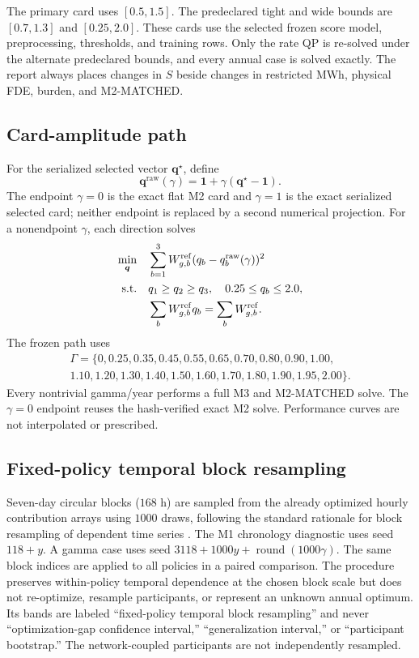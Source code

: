 \documentclass[10pt,journal,onecolumn]{IEEEtran}
\newcommand{\one}{\mathbf{1}}
\begin{document}
The primary card uses $[0.5,1.5]$. The predeclared tight and wide bounds are
$[0.7,1.3]$ and $[0.25,2.0]$. These cards use the selected frozen score model,
preprocessing, thresholds, and training rows. Only the rate QP is re-solved
under the alternate predeclared bounds, and every annual case is solved
exactly. The report always places changes in $S$ beside changes in restricted
MWh, physical FDE, burden, and M2-MATCHED.

\subsection{Card-amplitude path}

For the serialized selected vector $\bm q^\star$, define
\begin{equation}
\bm q^{\mathrm{raw}}(\gamma)
=\one+\gamma(\bm q^\star-\one).
\label{eq:report_gamma_raw}
\end{equation}
The endpoint $\gamma=0$ is the exact flat M2 card and $\gamma=1$ is the exact
serialized selected card; neither endpoint is replaced by a second numerical
projection. For a nonendpoint $\gamma$, each direction solves
\begin{align}
\min_{\bm q}\quad
&\sum_{b=1}^3W_{g,b}^{\mathrm{ref}}
(q_b-q_b^{\mathrm{raw}}(\gamma))^2
\label{eq:report_gamma_projection}\\
\mathrm{s.t.}\quad
&q_1\geq q_2\geq q_3,
\quad 0.25\leq q_b\leq2.0,
\notag\\
&\sum_bW_{g,b}^{\mathrm{ref}}q_b
=\sum_bW_{g,b}^{\mathrm{ref}}.
\notag
\end{align}
The frozen path uses
\begin{multline}
\Gamma=\{0,0.25,0.35,0.45,0.55,0.65,0.70,0.80,0.90,1.00,\\
1.10,1.20,1.30,1.40,1.50,1.60,1.70,1.80,1.90,1.95,2.00\}.
\label{eq:report_gamma_grid}
\end{multline}
Every nontrivial gamma/year performs a full M3 and M2-MATCHED solve. The
$\gamma=0$ endpoint reuses the
hash-verified exact M2 solve. Performance curves are not interpolated or
prescribed.

\subsection{Fixed-policy temporal block resampling}

Seven-day circular blocks ($168$ h) are sampled from the already optimized
hourly contribution arrays using $1000$ draws, following the standard rationale
for block resampling of dependent time series \cite{Kunsch1989,PolitisRomano1994}.
The M1 chronology diagnostic uses seed $118+y$. A gamma case uses seed
$3118+1000y+\operatorname{round}(1000\gamma)$. The same block indices are
applied to all policies in a paired comparison. The procedure preserves
within-policy temporal dependence at the chosen block scale but does not
re-optimize, resample participants, or represent an unknown annual optimum. Its
bands are labeled ``fixed-policy temporal block resampling'' and never
``optimization-gap confidence interval,'' ``generalization interval,'' or
``participant bootstrap.'' The network-coupled participants are not
independently resampled.
\end{document}
